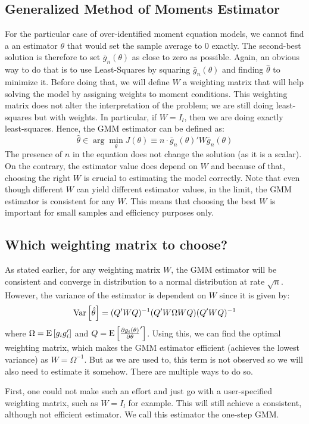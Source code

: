 \subsection{Generalized Method of Moments Estimator}

For the particular case of over-identified moment equation models, we cannot find a an estimator $\theta$ that would set the sample average to 0 exactly. The second-best solution is therefore to set $\bar g_n(\theta)$ as close to zero as possible. Again, an obvious way to do that is to use Least-Squares by squaring $\bar g_n(\theta)$ and finding $\hat\theta$ to minimize it. Before doing that, we will define $W$ a weighting matrix that will help solving the model by assigning weights to moment conditions. This weighting matrix does not alter the interpretation of the problem; we are still doing least-squares but with weights. In particular, if $W = I_l$, then we are doing exactly least-squares. Hence, the GMM estimator can be defined as: $$ \hat\theta \in\arg\min_{\theta} J(\theta) \equiv n\cdot \bar g_n(\theta)'W\bar g_n(\theta) $$ The presence of $n$ in the equation does not change the solution (as it is a scalar). On the contrary, the estimator value does depend on $W$ and because of that, choosing the right $W$ is crucial to estimating the model correctly. Note that even though different $W$ can yield different estimator values, in the limit, the GMM estimator is consistent for any $W$. This means that choosing the best $W$ is important for small samples and efficiency purposes only.

\subsection{Which weighting matrix to choose?}

As stated earlier, for any weighting matrix $W$, the GMM estimator will be consistent and converge in distribution to a normal distribution at rate $\sqrt{n}$. However, the variance of the estimator is dependent on $W$ since it is given by: $$ \operatorname{Var}\left[\hat\theta\right] = (Q'WQ)^{-1}(Q'W\Omega WQ)(Q'WQ)^{-1} $$ where $\Omega = \operatorname{E}\left[g_ig_i'\right]$ and $Q = \operatorname{E}\left[\frac{\partial g_i(\theta)}{\partial\theta}'\right]$. Using this, we can find the optimal weighting matrix, which makes the GMM estimator efficient (achieves the lowest variance) as $W = \Omega^{-1}$. But as we are used to, this term is not observed so we will also need to estimate it somehow. There are multiple ways to do so.

First, one could not make such an effort and just go with a user-specified weighting matrix, such as $W = I_l$ for example. This will still achieve a consistent, although not efficient estimator. We call this estimator the one-step GMM.

